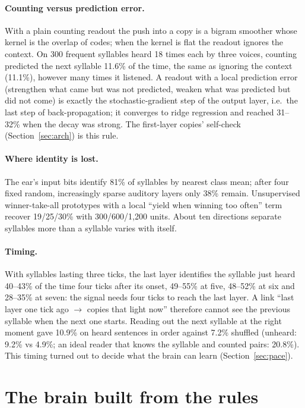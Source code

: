 \documentclass[11pt]{article}
\begin{document}
\paragraph{Counting versus prediction error.} With a plain counting readout the push into a copy is a bigram smoother whose
kernel is the overlap of codes; when the kernel is flat the readout ignores the context. On 300 frequent syllables heard
18 times each by three voices, counting predicted the next syllable 11.6\% of the time, the same as ignoring the context
(11.1\%), however many times it listened. A readout with a local prediction error (strengthen what came but was not
predicted, weaken what was predicted but did not come) is exactly the stochastic-gradient step of the output layer, i.e.\
the last step of back-propagation; it converges to ridge regression and reached 31--32\% when the decay was strong. The
first-layer copies' self-check (Section~\ref{sec:arch}) is this rule.

\paragraph{Where identity is lost.} The ear's input bits identify 81\% of syllables by nearest class mean; after four fixed
random, increasingly sparse auditory layers only 38\% remain. Unsupervised winner-take-all prototypes with a local
``yield when winning too often'' term recover 19/25/30\% with 300/600/1,200 units. About ten directions separate syllables
more than a syllable varies with itself.

\paragraph{Timing.} With syllables lasting three ticks, the last layer identifies the syllable just heard 40--43\% of the
time four ticks after its onset, 49--55\% at five, 48--52\% at six and 28--35\% at seven: the signal needs four ticks to
reach the last layer. A link ``last layer one tick ago $\to$ copies that light now'' therefore cannot see the previous
syllable when the next one starts. Reading out the next syllable at the right moment gave 10.9\% on heard sentences in
order against 7.2\% shuffled (unheard: 9.2\% vs 4.9\%; an ideal reader that knows the syllable and counted pairs: 20.8\%).
This timing turned out to decide what the brain can learn (Section~\ref{sec:pace}).

\section{The brain built from the rules}\label{sec:built}
\end{document}

